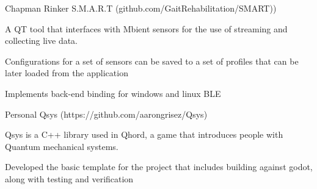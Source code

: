 

\begin{cventries}

  \cventry
    {Chapman Rinker} %
    {S.M.A.R.T ({\tiny github.com/GaitRehabilitation/SMART)})} %
    {} %
    {} %
    {
      \begin{cvitems} %
        \item {A QT tool that interfaces with Mbient sensors for the use of streaming and collecting live data.}
        \item{Configurations for a set of sensors can be saved to a set of profiles that can be later loaded from the application}
        \item{Implements back-end binding for windows and linux BLE}
      \end{cvitems}
    }


\cventry
    {Personal}
    {Qsys ({\tiny https://github.com/aarongrisez/Qsys})}
    {}
    {}
    {
     \begin{cvitems} %
        \item {Qsys is a C++ library used in Qhord, a game that introduces people with Quantum mechanical systems.}
        \item{Developed the basic template for the project that includes building against godot, along with testing and verification}
      \end{cvitems}
    }

\end{cventries}


